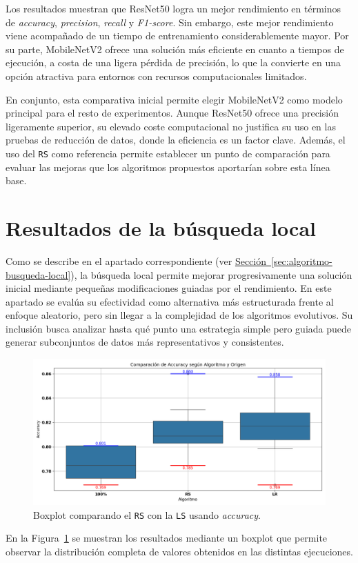 Los resultados muestran que ResNet50 logra un mejor rendimiento en términos de \textit{accuracy}, \textit{precision}, \textit{recall} y \textit{F1-score}.
Sin embargo, este mejor rendimiento viene acompañado de un tiempo de entrenamiento considerablemente mayor.
Por su parte, MobileNetV2 ofrece una solución más eficiente en cuanto a tiempos de ejecución, a costa de una ligera pérdida de precisión,
lo que la convierte en una opción atractiva para entornos con recursos computacionales limitados.

En conjunto, esta comparativa inicial permite elegir MobileNetV2 como modelo principal para el resto de experimentos.
Aunque ResNet50 ofrece una precisión ligeramente superior, su elevado coste computacional no justifica su uso en las pruebas de reducción de datos,
donde la eficiencia es un factor clave.
Además, el uso del \texttt{RS} como referencia permite establecer un punto de comparación para evaluar las mejoras que los algoritmos propuestos aportarían sobre esta línea base.


\section{Resultados de la búsqueda local}\label{sec:resultados-busqueda-local}
Como se describe en el apartado correspondiente (ver \hyperref[sec:algoritmo-busqueda-local]{Sección~\ref*{sec:algoritmo-busqueda-local}}),
la búsqueda local permite mejorar progresivamente una solución inicial mediante pequeñas modificaciones guiadas por el rendimiento.
En este apartado se evalúa su efectividad como alternativa más estructurada frente al enfoque aleatorio, pero sin llegar a la complejidad de los algoritmos evolutivos.
Su inclusión busca analizar hasta qué punto una estrategia simple pero guiada puede generar subconjuntos de datos más representativos y consistentes.

\begin{figure}[htp]
    \centering
    \includegraphics[width=1\textwidth]{imagenes/evaluaciones/comparacion_aleatorio-lr}
    \caption{Boxplot comparando el \texttt{RS} con la \texttt{LS} usando \textit{accuracy}.}
    \label{fig:aleatorio-vs-busqueda-local}
\end{figure}
En la Figura~\ref{fig:aleatorio-vs-busqueda-local} se muestran los resultados mediante un boxplot que permite observar
la distribución completa de valores obtenidos en las distintas ejecuciones.

